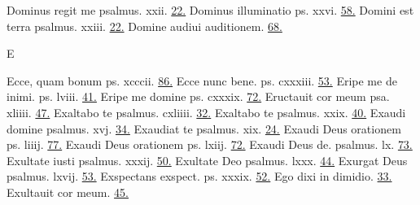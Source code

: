 \documentclass[a5paper,10pt]{book}
\begin{document}
\begin{multicols}{2}
\newline Dominus regit me psalmus. xxii. \hfill \hyperlink{ps22}{22.}
\newline Dominus illuminatio ps. xxvi. \hfill \hyperlink{ps26}{58.}
\newline Domini est terra psalmus. xxiii. \hfill \hyperlink{ps23}{22.}
\newline Domine audiui auditionem. \hfill \hyperlink{Habakkuk}{68.}
\newline \vspace{-1.75em}
\begin{center}
\color{red} E
\end{center}
\vspace{-.75em}
\par \noindent Ecce, quam bonum ps. xcccii. \hfill \hyperlink{ps132}{86.}
\newline Ecce nunc bene. ps. cxxxiii. \hfill \hyperlink{ps133}{53.}
\newline Eripe me de inimi. ps. lviii. \hfill \hyperlink{ps58}{41.}
\newline Eripe me domine ps. cxxxix. \hfill \hyperlink{ps139}{72.}
\newline Eructauit cor meum psa. xliiii. \hfill \hyperlink{ps44}{47.}
\newline Exaltabo te psalmus. cxliiii. \hfill \hyperlink{ps144}{32.}
\newline Exaltabo te psalmus. xxix. \hfill \hyperlink{ps29}{40.}
\newline Exaudi domine psalmus. xvj. \hfill \hyperlink{ps16}{34.}
\newline Exaudiat te psalmus. xix. \hfill \hyperlink{ps19}{24.}
\newline Exaudi Deus orationem ps. liiij. \hfill \hyperlink{ps54}{77.}
\newline Exaudi Deus orationem ps. lxiij. \hfill \hyperlink{ps63}{72.}
\newline Exaudi Deus de. psalmus. lx. \hfill \hyperlink{ps60}{73.}
\newline Exultate iusti psalmus. xxxij. \hfill \hyperlink{ps32}{50.}
\newline Exultate Deo psalmus. lxxx. \hfill \hyperlink{ps80}{44.}
\newline Exurgat Deus psalmus. lxvij. \hfill \hyperlink{ps67}{53.}
\newline Exspectans exspect. ps. xxxix. \hfill \hyperlink{ps39}{52.}
\newline Ego dixi in dimidio. \hfill \hyperlink{Ezekiel}{33.}
\newline Exultauit cor meum. \hfill \hyperlink{Anna}{45.}

\end{multicols}
\end{document}
